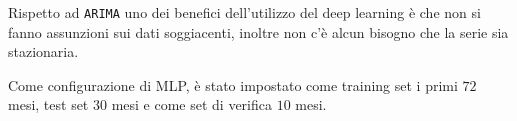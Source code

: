 Rispetto ad \verb|ARIMA| uno dei benefici dell'utilizzo del deep learning è che non si fanno assunzioni sui dati soggiacenti, inoltre non c'è
alcun bisogno che la serie sia stazionaria.

Come configurazione di MLP, è stato impostato come training set i primi $72$ mesi, test set $30$ mesi e come set di verifica $10$ mesi.